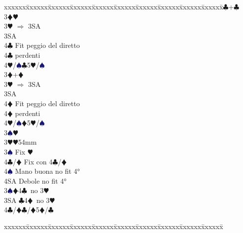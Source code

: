 \documentclass[a4paper,italian]{article}
\newcommand{\BC}{\textcolor{OliveGreen}{$\clubsuit$}}
\newcommand{\BD}{\textcolor{RedOrange}{$\vardiamondsuit$}}
\newcommand{\BH}{\textcolor{Red2}{$\varheartsuit${}}}
\newcommand{\BS}{\textcolor{MidnightBlue}{$\spadesuit${}}}
\newenvironment{bidtable}
{\begin{tabbing}

    xxxxxx\=xxxxxx\=xxxxxx\=xxxxxx\=xxxxxx\=xxxxxx\=xxxxxx\=xxxxxx\=xxxxxx\=xxxxxx\=\kill}
{\end{tabbing} }%
\begin{document}
\begin{multicols}{2}
\begin{bidtable}
                                            3\BC {}+\BC \+\\
                                            3\BD {}\BH \\
                                            3\BH \> $\Rightarrow$ 3SA\+\\
                                            3SA\+\\
                                            4\BC \> Fit peggio del diretto\-\\
                                            4\BC {} perdenti\\
                                            4\BH/\BS {}\BC 5\BH /\BS \-\-\\
                                            3\BD {}+\BD \+\\
                                            3\BH \> $\Rightarrow$ 3SA\+\\
                                            3SA\+\\
                                            4\BD \> Fit peggio del diretto\-\\
                                            4\BD {} perdenti\\
                                            4\BH/\BS {}\BD 5\BH /\BS \-\\
                                            3\BS {}\BH \-\\
                                            3\BH {}\BH 54mm\+\\
                                            3\BS \> Fix \BH \\
                                            4\BC/\BD \> Fix con 4\BC/\BD\\
                                            4\BS \> Mano buona no fit 4°\\
                                            4SA \> Debole no fit 4°\-\\
                                            3\BS {}\BD 4\BC\ no 3\BH \\
                                            3SA \BC 4\BD\ no 3\BH \\
                                            4\BC/\BD {}\BC /\BD 5\BD /\BC\\
                                        \end{bidtable}
                                        \columnbreak
                                        \begin{bidtable}

\end{bidtable}
\end{multicols}
\end{document}
